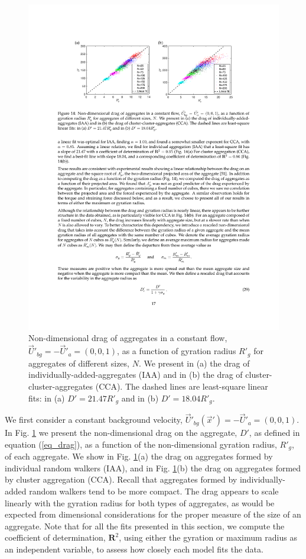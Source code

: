\begin{figure}[ht]
	\begin{center}
		\includegraphics[scale = 1.0]{./figures/fig_drag_allprime.pdf}
	\end{center}
	\caption{Non-dimensional drag of aggregates in a constant flow, $\vec{U}'_{bg} = -\vec{U}'_a = (0,0,1)$, as a function of gyration radius $R'_g$ for aggregates of different sizes, $N$. We present in (a) the drag of individually-added-aggregates (IAA) and in (b) the drag of cluster-cluster-aggregates (CCA). The dashed lines are least-square linear fits: in (a) $D' = 21.47 R'_g$ and in (b) $D' =18.04 R'_g$.}
	\label{fig_drag_raw}
\end{figure}

We first consider a constant background velocity, $\vec{U}'_{bg}(\vec{x}') = -\vec{U}'_a=(0,0,1)$. In Fig. \ref{fig_drag_raw} we present the non-dimensional drag on the aggregate, $D'$, as defined in equation (\ref{eq_drag}),
 as a function of the non-dimensional gyration radius, $R'_g$, of each aggregate. We show in Fig. \ref{fig_drag_raw}(a) the drag on aggregates formed by individual random walkers (IAA), and in Fig. \ref{fig_drag_raw}(b) the drag on aggregates formed by cluster aggregation (CCA).
 Recall that aggregates formed by individually-added random walkers tend to be more compact.
The drag appears to scale linearly with the gyration radius for both types of aggregates, as would be expected from dimensional considerations for the proper measure of the size of an aggregate. 
Note that for all the fits presented in this section, we compute the coefficient of determination, $\mathbf{R}^2$, using either the gyration or maximum radius as an independent variable, to assess how closely each model fits the data. 

